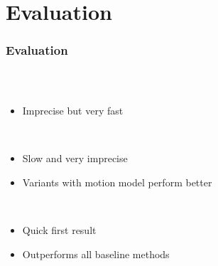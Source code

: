 \begin{frame}
\begin{columns}
\begin{column}{0.4\textwidth}
  \end{column}
  \end{columns}
\end{frame}

\section{Evaluation}
\begin{frame}
  \frametitle{Evaluation}
  \begin{columns}
  \begin{column}{0.6\textwidth}
  \begin{description}[]
  \item[Kalman Filter] \hfill \\
  \begin{itemize}
  \item Imprecise but very fast
  \end{itemize}
  \pause
  \item[ICP] \hfill \\
  \begin{itemize}
  \item Slow and very imprecise
  \item Variants with motion model perform better
  \end{itemize}
  \pause
  \item[ADH] \hfill \\
  \begin{itemize}
  \item Quick first result
  \item Outperforms all baseline methods
  \end{itemize}
  \end{description}
  \end{column}
  \begin{column}{0.5\textwidth}
\end{column}
\end{columns}
\end{frame}
